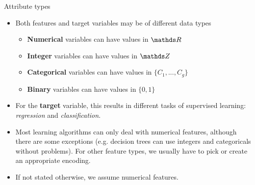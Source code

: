 \documentclass[11pt,compress,t,notes=noshow, xcolor=table]{beamer}
\begin{document}

\begin{vbframe}{Attribute types}

\begin{itemize}

  \item Both features and target variables may be of different data types 
  
  \begin{itemize}
  
    \item \textbf{Numerical} variables can have values in $\R$
    
    \item \textbf{Integer} variables can have values in $\Z$
    
    \item \textbf{Categorical} variables can have values in $\{C_1,...,C_g\}$
    
    \item \textbf{Binary} variables can have values in $\{0, 1\}$
  
  \end{itemize}
  
  \item For the \textbf{target} variable, this results in different tasks of supervised learning: \textit{regression} and \textit{classification}. 
  
  \item Most learning algorithms can only deal with numerical features,
      although there are some exceptions (e.g. decision trees can use integers and categoricals without problems).
      For other feature types, we usually have to pick or create an
      appropriate encoding.
  \item If not stated otherwise, we assume numerical features. 

\end{itemize}

\end{vbframe}

\end{document}
